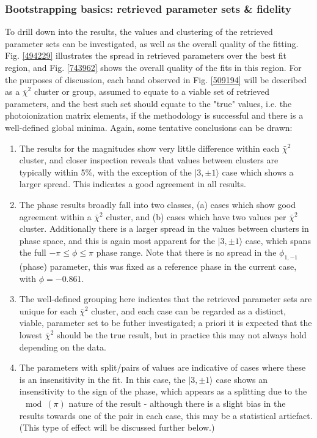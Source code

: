 \documentclass[10pt]{article}
\begin{document}
\subsubsection{Bootstrapping basics: retrieved parameter sets \& fidelity\label{sec:bootstrap-fidelity}}

To drill down into the results, the values and clustering of the retrieved parameter sets can be investigated, as well as the overall quality of the fitting. Fig. \ref{494229} illustrates the spread in retrieved parameters over the best fit region, and Fig. \ref{743962} shows the overall quality of the fits in this region. For the purposes of discussion, each band observed in Fig. \ref{509194} will be described as a $\bar{\chi}^2$ cluster or group, assumed to equate to a viable set of retrieved parameters, and the best such set should equate to the "true" values, i.e. the photoionization matrix elements, if the methodology is successful and there is a well-defined global minima. Again, some tentative conclusions can be drawn:

\begin{enumerate}
\item The results for the magnitudes show very little difference within each $\bar{\chi}^2$ cluster, and closer inspection reveals that values between clusters are typically within 5\%, with the exception of the $|3,\pm1\rangle$ case which shows a larger spread. This indicates a good agreement in all results.
\item The phase results broadly fall into two classes, (a) cases which show good agreement within a $\bar{\chi}^2$ cluster, and (b) cases which have two values per $\bar{\chi}^2$ cluster. Additionally there is a larger spread in the values between clusters in phase space, and this is again most apparent for the $|3,\pm1\rangle$ case, which spans the full $-\pi\leq\phi\leq\pi$ phase range. Note that there is no spread in the $\phi_{1,-1}$ (phase) parameter, this was fixed as a reference phase in the current case, with $\phi=-0.861$.
\item The well-defined grouping here indicates that the retrieved parameter sets are unique for each $\bar{\chi}^2$ cluster, and each case can be regarded as a distinct, viable, parameter set to be futher investigated; a priori it is expected that the lowest $\bar{\chi}^2$ should be the true result, but in practice this may not always hold depending on the data.
\item The parameters with split/pairs of values are indicative of cases where these is an insensitivity in the fit. In this case, the $|3,\pm1\rangle$ case shows an insensitivity to the sign of the phase, which appears as a splitting due to the $\mod(\pi)$ nature of the result - although there is a slight bias in the results towards one of the pair in each case, this may be a statistical artiefact. (This type of effect will be discussed further below.)
\end{enumerate}
\end{document}

